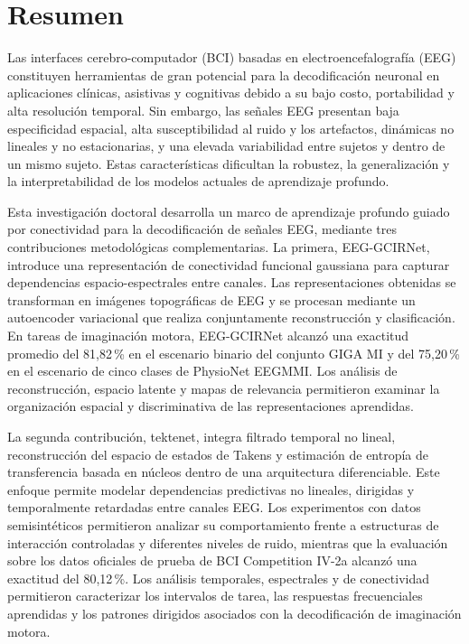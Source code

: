 \newpage
\chapter*{\sffamily Resumen}
%

\par Las interfaces cerebro-computador (BCI) basadas en electroencefalografía (EEG) constituyen herramientas de gran potencial para la decodificación neuronal en aplicaciones clínicas, asistivas y cognitivas debido a su bajo costo, portabilidad y alta resolución temporal. Sin embargo, las señales EEG presentan baja especificidad espacial, alta susceptibilidad al ruido y los artefactos, dinámicas no lineales y no estacionarias, y una elevada variabilidad entre sujetos y dentro de un mismo sujeto. Estas características dificultan la robustez, la generalización y la interpretabilidad de los modelos actuales de aprendizaje profundo.

Esta investigación doctoral desarrolla un marco de aprendizaje profundo guiado por conectividad para la decodificación de señales EEG, mediante tres contribuciones metodológicas complementarias. La primera, EEG-GCIRNet, introduce una representación de conectividad funcional gaussiana para capturar dependencias espacio-espectrales entre canales. Las representaciones obtenidas se transforman en imágenes topográficas de EEG y se procesan mediante un autoencoder variacional que realiza conjuntamente reconstrucción y clasificación. En tareas de imaginación motora, EEG-GCIRNet alcanzó una exactitud promedio del 81,82\,\% en el escenario binario del conjunto GIGA MI y del 75,20\,\% en el escenario de cinco clases de PhysioNet EEGMMI. Los análisis de reconstrucción, espacio latente y mapas de relevancia permitieron examinar la organización espacial y discriminativa de las representaciones aprendidas.

La segunda contribución, \gls{tektenet}, integra filtrado temporal no lineal, reconstrucción del espacio de estados de Takens y estimación de entropía de transferencia basada en núcleos dentro de una arquitectura diferenciable. Este enfoque permite modelar dependencias predictivas no lineales, dirigidas y temporalmente retardadas entre canales EEG. Los experimentos con datos semisintéticos permitieron analizar su comportamiento frente a estructuras de interacción controladas y diferentes niveles de ruido, mientras que la evaluación sobre los datos oficiales de prueba de BCI Competition IV-2a alcanzó una exactitud del 80,12\,\%. Los análisis temporales, espectrales y de conectividad permitieron caracterizar los intervalos de tarea, las respuestas frecuenciales aprendidas y los patrones dirigidos asociados con la decodificación de imaginación motora.

